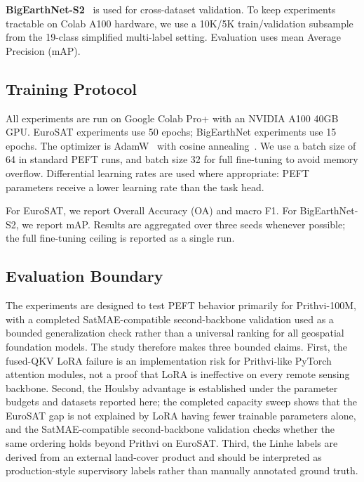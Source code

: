 \textbf{BigEarthNet-S2}~\cite{sumbul2019bigearthnet} is used for cross-dataset validation. To keep experiments tractable on Colab A100 hardware, we use a 10K/5K train/validation subsample from the 19-class simplified multi-label setting. Evaluation uses mean Average Precision (mAP).

\subsection{Training Protocol}
All experiments are run on Google Colab Pro+ with an NVIDIA A100 40GB GPU. EuroSAT experiments use 50 epochs; BigEarthNet experiments use 15 epochs. The optimizer is AdamW~\cite{loshchilov2019adamw} with cosine annealing~\cite{loshchilov2017sgdr}. We use a batch size of 64 in standard PEFT runs, and batch size 32 for full fine-tuning to avoid memory overflow. Differential learning rates are used where appropriate: PEFT parameters receive a lower learning rate than the task head.

For EuroSAT, we report Overall Accuracy (OA) and macro F1. For BigEarthNet-S2, we report mAP. Results are aggregated over three seeds whenever possible; the full fine-tuning ceiling is reported as a single run.

\subsection{Evaluation Boundary}
The experiments are designed to test PEFT behavior primarily for Prithvi-100M, with a completed SatMAE-compatible second-backbone validation used as a bounded generalization check rather than a universal ranking for all geospatial foundation models. The study therefore makes three bounded claims. First, the fused-QKV LoRA failure is an implementation risk for Prithvi-like PyTorch attention modules, not a proof that LoRA is ineffective on every remote sensing backbone. Second, the Houlsby advantage is established under the parameter budgets and datasets reported here; the completed capacity sweep shows that the EuroSAT gap is not explained by LoRA having fewer trainable parameters alone, and the SatMAE-compatible second-backbone validation checks whether the same ordering holds beyond Prithvi on EuroSAT. Third, the Linhe labels are derived from an external land-cover product and should be interpreted as production-style supervisory labels rather than manually annotated ground truth.

